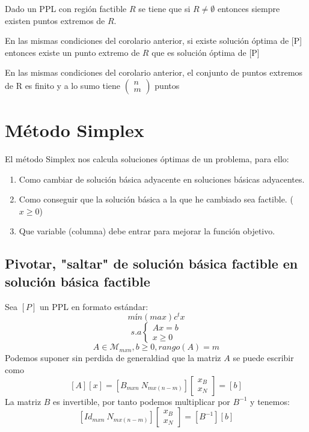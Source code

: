 \documentclass[11pt,fleqn]{book} %
\begin{document}
\begin{corollary}
	Dado un PPL con región factible $R$ se tiene que si $R \neq \emptyset$ entonces siempre existen puntos extremos de $R$.
\end{corollary}
\begin{corollary}
En las mismas condiciones del corolario anterior, si existe solución óptima de [P] entonces existe un punto extremo de $R$ que es solución óptima de [P]
\end{corollary}
\begin{corollary}
	En las mismas condiciones del corolario anterior, el conjunto de puntos extremos de R es finito y a lo sumo tiene $\left(\begin{array}{c}
	n \\ m
	\end{array}\right)$ puntos
\end{corollary}

\section{Método Simplex}
El método Simplex nos calcula soluciones óptimas de un problema, para ello:
\begin{enumerate}
	\item Como cambiar de solución básica adyacente en soluciones básicas adyacentes.
	\item Como conseguir que la solución básica a la que he cambiado sea factible. ($x \geq 0$)
	\item Que variable (columna) debe entrar para mejorar la función objetivo.
\end{enumerate}
\subsection{Pivotar, "saltar" de solución básica factible en solución básica factible}
Sea $[P]$ un PPL en formato estándar:
$$ mín(max) c^t x$$
$$
s.a \left\{\begin{array}{c}
Ax=b \\
x \geq 0
\end{array}\right.
$$
$$ A \in \mathcal{M}_{mxn}, b\geq 0, rango(A)=m$$
Podemos suponer sin perdida de generaldiad que la matriz $A$ se puede escribir como $$[A][x]=[B_{mxn} ~ N_{mx(n-m)}]\left[\begin{array}{c}
x_B \\
x_N
\end{array}\right]=[b]$$
La matriz $B$ es invertible, por tanto podemos multiplicar por $B^{-1}$ y tenemos:
$$[Id_{mxn} ~ N_{mx(n-m)}]\left[\begin{array}{c}
x_B \\
x_N
\end{array}\right]=[B^{-1}][b]$$
\end{document}
